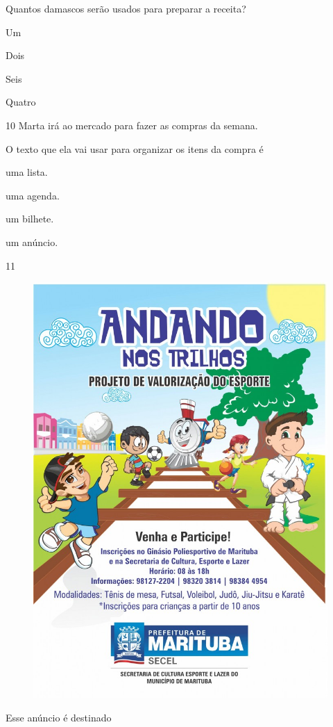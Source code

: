 Quantos damascos serão usados para preparar a receita?

\begin{escolha}
\item Um

\item Dois

\item Seis

\item Quatro
\end{escolha}


\num{10} Marta irá ao mercado para fazer as compras da semana.

O texto que ela vai usar para organizar os itens da compra é

\begin{escolha}
\item uma lista.

\item uma agenda.

\item um bilhete.

\item um anúncio.
\end{escolha}

\num{11}

\begin{figure}[htpb!]
\centering
\includegraphics[width=.5\textwidth]{media/image170.jpeg}
\end{figure}


Esse anúncio é destinado

